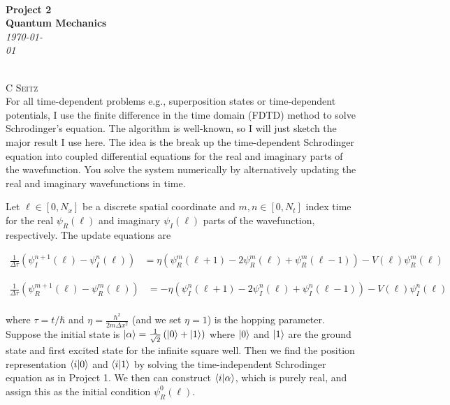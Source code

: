\documentclass[12pt]{article}
\theoremstyle{definition}
\begin{document}
 {\noindent\Huge\bf  \\[0.5\baselineskip] {\selectfont  Project 2}         }\\[2\baselineskip] %
{ {\bf {}\selectfont Quantum Mechanics}\\ {\textit{\selectfont     \today}}}~~~~~~~~~~~~~~~~~~~~~~~~~~~~~~~~~~~~~~~~~~~~~~~~~~~~~~~~~~~~~~~~~~~~~~~~~~~~~    
{\large \textsc{C Seitz}
\\[1.4\baselineskip] 

For all time-dependent problems e.g., superposition states or time-dependent potentials, I use the finite difference in the time domain (FDTD) method to solve Schrodinger's equation. The algorithm is well-known, so I will just sketch the major result I use here. The idea is the break up the time-dependent Schrodinger equation into coupled differential equations for the real and imaginary parts of the wavefunction. You solve the system numerically by alternatively updating the real and imaginary wavefunctions in time.

Let $\ell\in [0,N_{x}]$ be a discrete spatial coordinate and $m,n\in[0,N_{t}]$ index time for the real $\psi_{R}(\ell)$ and imaginary $\psi_{I}(\ell)$ parts of the wavefunction, respectively. The update equations are

\begin{align*}
\frac{1}{\Delta \tau}\left(\psi_{I}^{n+1}(\ell)-\psi_{I}^{n}(\ell)\right) &= \eta\left(\psi_{R}^{m}(\ell + 1) - 2\psi_{R}^{m}(\ell)+ \psi_{R}^{m}(\ell -1 )\right) - V(\ell)\psi_{R}^{m}(\ell)
\end{align*}

\begin{align*}
\frac{1}{\Delta \tau}\left(\psi_{R}^{m+1}(\ell)-\psi_{R}^{m}(\ell)\right) &= -\eta\left(\psi_{I}^{n}(\ell + 1) - 2\psi_{I}^{n}(\ell)+ \psi_{I}^{n}(\ell -1 )\right) - V(\ell)\psi_{I}^{n}(\ell)\\
\end{align*}

where $\tau = t/\hbar$ and $\eta = \frac{\hbar^{2}}{2m\Delta x^{2}}$ (and we set $\eta=1$) is the hopping parameter. Suppose the initial state is $\ket{\alpha} = \frac{1}{\sqrt{2}}\left(\ket{0} + \ket{1}\right)$ where $\ket{0}$ and $\ket{1}$ are the ground state and first excited state for the infinite square well. Then we find the position representation $\bra{i}\ket{0}$ and $\bra{i}\ket{1}$ by solving the time-independent Schrodinger equation as in Project 1. We then can construct $\bra{i}\ket{\alpha}$, which is purely real, and assign this as the initial condition $\psi_{R}^{0}(\ell)$.

}
\end{document}
